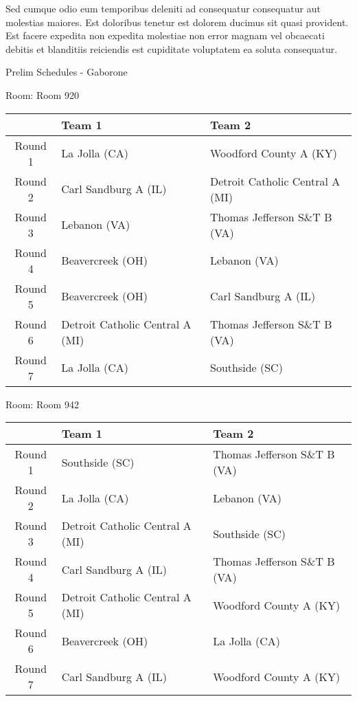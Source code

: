 \documentclass{article}%
\begin{document}
\newline%
Sed cumque odio eum temporibus deleniti ad consequatur consequatur aut molestias maiores. Est doloribus tenetur est dolorem ducimus sit quasi provident. Est facere expedita non expedita molestiae non error magnam vel obcaecati debitis et blanditiis reiciendis est cupiditate voluptatem ea soluta consequatur.%
\newpage%
\begin{center}%
\begin{Huge}%
Prelim Schedules {-} Gaborone%
\end{Huge}%
\end{center}%
\begin{flushleft}%
\begin{Large}%
Room: Room 920%
\end{Large}%
\end{flushleft}%
\begin{tabularx}{\textwidth}{|c|Y|Y|}%
\hline%
&Team 1&Team 2\\%
\hline%
Round 1&La Jolla (CA)&Woodford County A (KY)\\%
Round 2&Carl Sandburg A (IL)&Detroit Catholic Central A (MI)\\%
Round 3&Lebanon (VA)&Thomas Jefferson S\&T B (VA)\\%
Round 4&Beavercreek (OH)&Lebanon (VA)\\%
Round 5&Beavercreek (OH)&Carl Sandburg A (IL)\\%
Round 6&Detroit Catholic Central A (MI)&Thomas Jefferson S\&T B (VA)\\%
Round 7&La Jolla (CA)&Southside (SC)\\%
\hline%
\end{tabularx}%
\vspace*{8pt}%
\linebreak%
\begin{flushleft}%
\begin{Large}%
Room: Room 942%
\end{Large}%
\end{flushleft}%
\begin{tabularx}{\textwidth}{|c|Y|Y|}%
\hline%
&Team 1&Team 2\\%
\hline%
Round 1&Southside (SC)&Thomas Jefferson S\&T B (VA)\\%
Round 2&La Jolla (CA)&Lebanon (VA)\\%
Round 3&Detroit Catholic Central A (MI)&Southside (SC)\\%
Round 4&Carl Sandburg A (IL)&Thomas Jefferson S\&T B (VA)\\%
Round 5&Detroit Catholic Central A (MI)&Woodford County A (KY)\\%
Round 6&Beavercreek (OH)&La Jolla (CA)\\%
Round 7&Carl Sandburg A (IL)&Woodford County A (KY)\\%
\hline%
\end{tabularx}%
\end{document}
